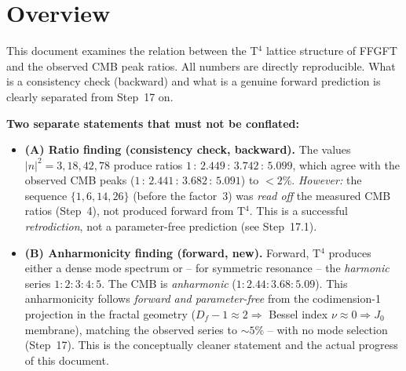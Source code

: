 %
%

\section*{Overview}

This document examines the relation between the T$^4$ lattice structure of
FFGFT and the observed CMB peak ratios. All numbers are directly
reproducible. What is a consistency check (backward) and what is a genuine
forward prediction is clearly separated from Step~17 on.

\textbf{Two separate statements that must not be conflated:}
\begin{itemize}
  \item \textbf{(A) Ratio finding (consistency check, backward).}
        The values $|n|^2 = 3, 18, 42, 78$ produce ratios
        $1\,:\,2{.}449\,:\,3{.}742\,:\,5{.}099$, which agree with the observed
        CMB peaks ($1\,:\,2{.}441\,:\,3{.}682\,:\,5{.}091$) to $<2\%$.
        \emph{However:} the sequence $\{1,6,14,26\}$ (before the factor~3) was
        \emph{read off} the measured CMB ratios (Step~4), not produced forward
        from T$^4$. This is a successful \emph{retrodiction}, not a
        parameter-free prediction (see Step~17.1).
  \item \textbf{(B) Anharmonicity finding (forward, new).}
        Forward, T$^4$ produces either a dense mode spectrum or -- for
        symmetric resonance -- the \emph{harmonic} series $1:2:3:4:5$. The CMB
        is \emph{anharmonic} ($1:2{.}44:3{.}68:5{.}09$). This anharmonicity
        follows \emph{forward and parameter-free} from the codimension-1
        projection in the fractal geometry ($D_f-1 \approx 2 \Rightarrow$
        Bessel index $\nu\approx0 \Rightarrow J_0$ membrane), matching the
        observed series to $\sim5\%$ -- with no mode selection (Step~17). This
        is the conceptually cleaner statement and the actual progress of this
        document.
\end{itemize}


